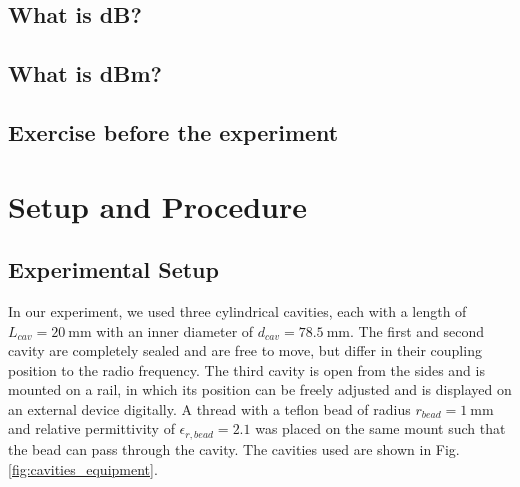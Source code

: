 \documentclass[a4paper]{report}
\numberwithin{equation}{section}
\begin{document}
\section{What is dB?}

\section{What is dBm?}

\section{Exercise before the experiment}

\chapter{Setup and Procedure}

\section{Experimental Setup}

In our experiment, we used three cylindrical cavities, each with a length of
$L_{cav} = \SI{20}{\milli\metre}$ with an inner diameter of $d_{cav} =
\SI{78.5}{\milli\metre}$. The first and second cavity are completely sealed and
are free to move, but differ in their coupling position to the radio frequency.
The third cavity is open from the sides and is mounted on a rail, in which its
position can be freely adjusted and is displayed on an external device
digitally. A thread with a teflon bead of radius $r_{bead} = \SI{1}{\milli\metre}$ and
relative permittivity of $\epsilon_{r, bead} = 2.1$ was placed on the same
mount such that the bead can pass through the cavity. The cavities used are shown in Fig.
\ref{fig:cavities_equipment}.
\end{document}
